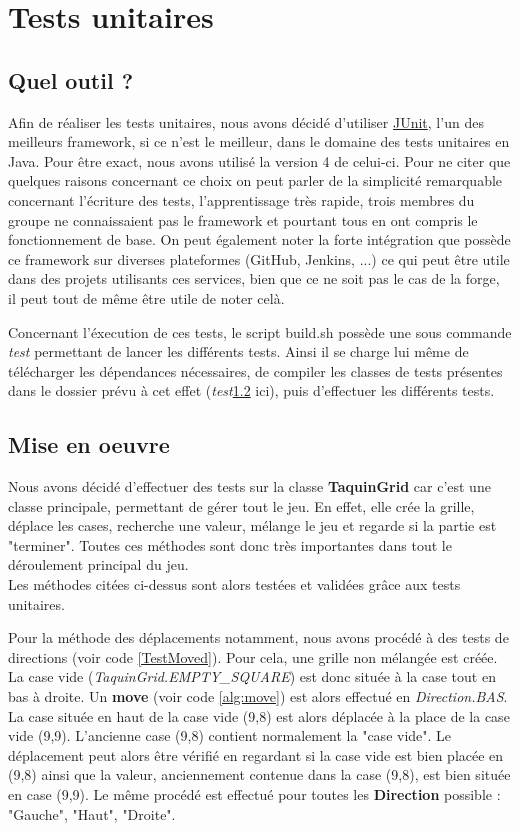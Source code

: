 	\section{Tests unitaires}
		\subsection{Quel outil ?}

			Afin de réaliser les tests unitaires, nous avons décidé d'utiliser \href{https://junit.org/junit4/}{JUnit}, l'un des meilleurs framework, si ce n'est le meilleur, dans le domaine des tests unitaires en Java. Pour être exact, nous avons utilisé la version 4 de celui-ci. Pour ne citer que quelques raisons concernant ce choix on peut parler de la simplicité remarquable concernant l'écriture des tests, l'apprentissage très rapide, trois membres du groupe ne connaissaient pas le framework et pourtant tous en ont compris le fonctionnement de base. On peut également noter la forte intégration que possède ce framework sur diverses plateformes (GitHub, Jenkins, ...) ce qui peut être utile dans des projets utilisants ces services, bien que ce ne soit pas le cas de la forge, il peut tout de même être utile de noter celà.

			Concernant l'éxecution de ces tests, le script build.sh possède une sous commande \textit{test} permettant de lancer les différents tests. Ainsi il se charge lui même de télécharger les dépendances nécessaires, de compiler les classes de tests présentes dans le dossier prévu à cet effet (\textit{test}\ref{} ici), puis d'effectuer les différents tests.

		\subsection{Mise en oeuvre}
			Nous avons décidé d'effectuer des tests sur la classe \textbf{TaquinGrid} car c'est une classe principale, permettant de gérer tout le jeu. En effet, elle crée la grille, déplace les cases, recherche une valeur, mélange le jeu et regarde si la partie est "terminer". Toutes ces méthodes sont donc très importantes dans tout le déroulement principal du jeu.\\
			Les méthodes citées ci-dessus sont alors testées et validées grâce aux tests unitaires.

			Pour la méthode des déplacements notamment, nous avons procédé à des tests de directions (voir code \ref{TestMoved}). Pour cela, une grille non mélangée est créée. La case vide (\textit{TaquinGrid.EMPTY\_SQUARE}) est donc située à la case tout en bas à droite. Un \textbf{move} (voir code \ref{alg:move}) est alors effectué en \textit{Direction.BAS}. La case située en haut de la case vide (9,8) est alors déplacée à la place de la case vide (9,9). L'ancienne case (9,8) contient normalement la "case vide". Le déplacement peut alors être vérifié en regardant si la case vide est bien placée en (9,8) ainsi que la valeur, anciennement contenue dans la case (9,8), est bien située en case (9,9). Le même procédé est effectué pour toutes les \textbf{Direction} possible : "Gauche", "Haut", "Droite".

